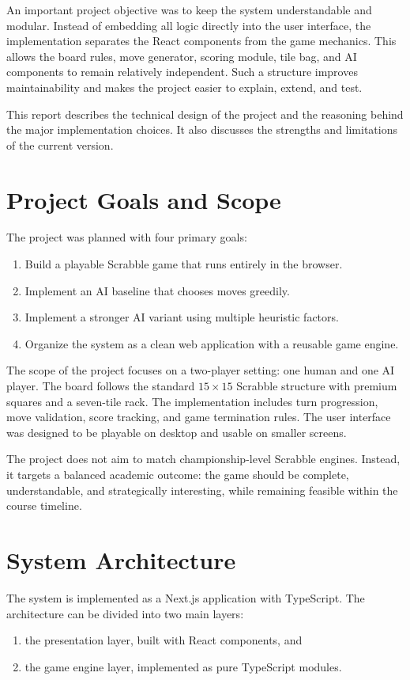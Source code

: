 \documentclass[conference]{IEEEtran}
\begin{document}
An important project objective was to keep the system understandable and modular. Instead of embedding all logic directly into the user interface, the implementation separates the React components from the game mechanics. This allows the board rules, move generator, scoring module, tile bag, and AI components to remain relatively independent. Such a structure improves maintainability and makes the project easier to explain, extend, and test.

This report describes the technical design of the project and the reasoning behind the major implementation choices. It also discusses the strengths and limitations of the current version.

\section{Project Goals and Scope}
The project was planned with four primary goals:
\begin{enumerate}
\item Build a playable Scrabble game that runs entirely in the browser.
\item Implement an AI baseline that chooses moves greedily.
\item Implement a stronger AI variant using multiple heuristic factors.
\item Organize the system as a clean web application with a reusable game engine.
\end{enumerate}

The scope of the project focuses on a two-player setting: one human and one AI player. The board follows the standard $15 \times 15$ Scrabble structure with premium squares and a seven-tile rack. The implementation includes turn progression, move validation, score tracking, and game termination rules. The user interface was designed to be playable on desktop and usable on smaller screens.

The project does not aim to match championship-level Scrabble engines. Instead, it targets a balanced academic outcome: the game should be complete, understandable, and strategically interesting, while remaining feasible within the course timeline.

\section{System Architecture}
The system is implemented as a Next.js application with TypeScript. The architecture can be divided into two main layers:
\begin{enumerate}
\item the presentation layer, built with React components, and
\item the game engine layer, implemented as pure TypeScript modules.
\end{enumerate}
\end{document}
